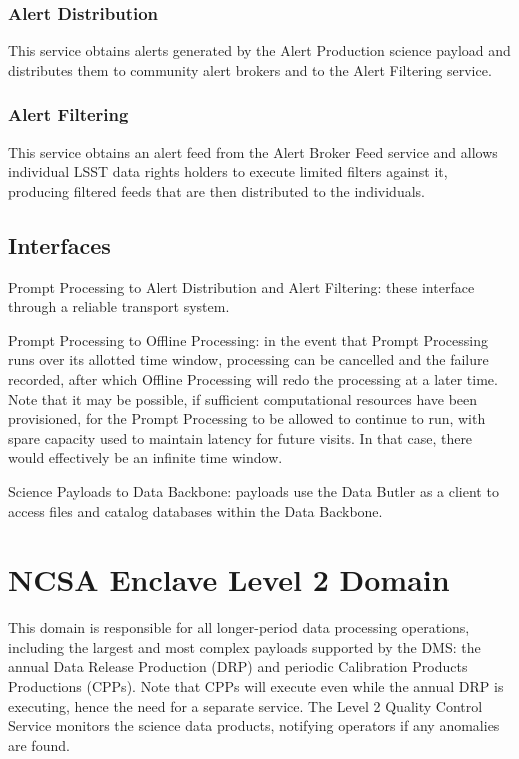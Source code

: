 \documentclass[]{article}
\begin{document}
\subsubsection{Alert Distribution}\label{alert-distribution}

This service obtains alerts generated by the Alert Production science
payload and distributes them to community alert brokers and to the Alert
Filtering service.

\subsubsection{Alert Filtering}\label{alert-filtering}

This service obtains an alert feed from the Alert Broker Feed service
and allows individual LSST data rights holders to execute limited
filters against it, producing filtered feeds that are then distributed
to the individuals.

\subsection{Interfaces}\label{interfaces-1}

Prompt Processing to Alert Distribution and Alert Filtering: these
interface through a reliable transport system.

Prompt Processing to Offline Processing: in the event that Prompt
Processing runs over its allotted time window, processing can be
cancelled and the failure recorded, after which Offline Processing will
redo the processing at a later time. Note that it may be possible, if
sufficient computational resources have been provisioned, for the Prompt
Processing to be allowed to continue to run, with spare capacity used to
maintain latency for future visits. In that case, there would
effectively be an infinite time window.

Science Payloads to Data Backbone: payloads use the Data Butler as a
client to access files and catalog databases within the Data Backbone.

\section{NCSA Enclave Level 2 Domain}\label{ncsa-enclave-level-2-domain}

This domain is responsible for all longer-period data processing
operations, including the largest and most complex payloads supported by
the DMS: the annual Data Release Production (DRP) and periodic
Calibration Products Productions (CPPs). Note that CPPs will execute
even while the annual DRP is executing, hence the need for a separate
service. The Level 2 Quality Control Service monitors the science data
products, notifying operators if any anomalies are found.
\end{document}
